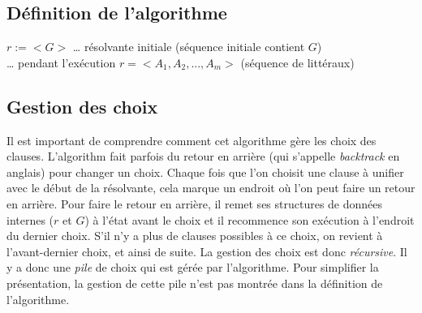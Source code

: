 \subsection{Définition de l'algorithme}

\begin{algorithm}[H]
$r := <G>$ … résolvante initiale (séquence initiale contient $G$) \\
… pendant l'exécution $r= <A_{1},A_{2},...,A_{m}>$ (séquence de littéraux)\\
\end{algorithm}

\subsection{Gestion des choix}

Il est important de comprendre comment cet algorithme gère les choix des clauses.
L'algorithm fait parfois du retour en arrière (qui s'appelle {\em backtrack} en anglais) pour changer un choix.
Chaque fois que l'on choisit une clause à unifier avec le début de la résolvante,
cela marque un endroit où l'on peut faire un retour en arrière. 
Pour faire le retour en arrière,
il remet ses structures de données internes ($r$ et $G$) à l'état avant le choix
et il recommence son exécution à l'endroit du dernier choix.
S'il n'y a plus de clauses possibles à ce choix,
on revient à l'avant-dernier choix, et ainsi de suite.
La gestion des choix est donc {\em récursive}.
Il y a donc une {\em pile} de choix qui est gérée par l'algorithme.
Pour simplifier la présentation, la gestion de cette pile n'est pas montrée dans la définition de l'algorithme.

